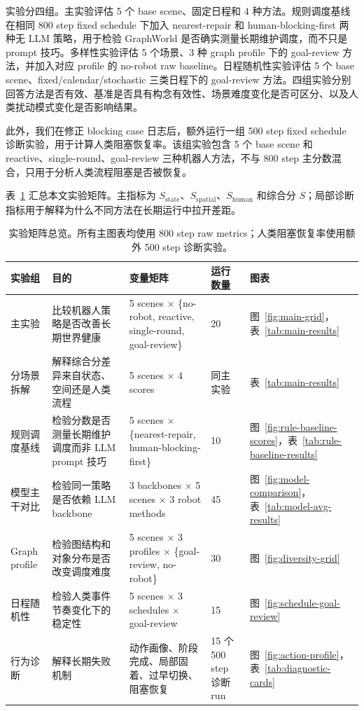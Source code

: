 \documentclass[journal]{IEEEtran}
\begin{document}
实验分四组。主实验评估 5 个 base scene、固定日程和 4 种方法。规则调度基线在相同 800 step fixed schedule 下加入 nearest-repair 和 human-blocking-first 两种无 LLM 策略，用于检验 GraphWorld 是否确实测量长期维护调度，而不只是 prompt 技巧。多样性实验评估 5 个场景、3 种 graph profile 下的 goal-review 方法，并加入对应 profile 的 no-robot raw baseline。日程随机性实验评估 5 个 base scene、fixed/calendar/stochastic 三类日程下的 goal-review 方法。四组实验分别回答方法是否有效、基准是否具有构念有效性、场景难度变化是否可区分、以及人类扰动模式变化是否影响结果。

此外，我们在修正 blocking case 日志后，额外运行一组 500 step fixed schedule 诊断实验，用于计算人类阻塞恢复率。该组实验包含 5 个 base scene 和 reactive、single-round、goal-review 三种机器人方法，不与 800 step 主分数混合，只用于分析人类流程阻塞是否被恢复。

表~\ref{tab:experiment-matrix} 汇总本文实验矩阵。主指标为 $S_{\mathrm{state}}$、$S_{\mathrm{spatial}}$、$S_{\mathrm{human}}$ 和综合分 $S$；局部诊断指标用于解释为什么不同方法在长期运行中拉开差距。

\begin{table}[t]
\centering
\caption{实验矩阵总览。所有主图表均使用 800 step raw metrics；人类阻塞恢复率使用额外 500 step 诊断实验。}
\label{tab:experiment-matrix}
\footnotesize
\setlength{\tabcolsep}{3.4pt}
\renewcommand{\arraystretch}{1.12}
\begin{tabular}{p{}p{}p{}p{}p{}}
\toprule
实验组 & 目的 & 变量矩阵 & 运行数量 & 图表 \\
\midrule
主实验 & 比较机器人策略是否改善长期世界健康 & 5 scenes $\times$ \{no-robot, reactive, single-round, goal-review\} & 20 & 图~\ref{fig:main-grid}，表~\ref{tab:main-results} \\
分场景拆解 & 解释综合分差异来自状态、空间还是人类流程 & 5 scenes $\times$ 4 scores & 同主实验 & 表~\ref{tab:main-results} \\
规则调度基线 & 检验分数是否测量长期维护调度而非 LLM prompt 技巧 & 5 scenes $\times$ \{nearest-repair, human-blocking-first\} & 10 & 图~\ref{fig:rule-baseline-scores}，表~\ref{tab:rule-baseline-results} \\
模型主干对比 & 检验同一策略是否依赖 LLM backbone & 3 backbones $\times$ 5 scenes $\times$ 3 robot methods & 45 & 图~\ref{fig:model-comparison}，表~\ref{tab:model-avg-results} \\
Graph profile & 检验图结构和对象分布是否改变调度难度 & 5 scenes $\times$ 3 profiles $\times$ \{goal-review, no-robot\} & 30 & 图~\ref{fig:diversity-grid} \\
日程随机性 & 检验人类事件节奏变化下的稳定性 & 5 scenes $\times$ 3 schedules $\times$ goal-review & 15 & 图~\ref{fig:schedule-goal-review} \\
行为诊断 & 解释长期失败机制 & 动作画像、阶段完成、局部固着、过早切换、阻塞恢复 & 15 个 500 step 诊断 run & 图~\ref{fig:action-profile}，表~\ref{tab:diagnostic-cards} \\
\bottomrule
\end{tabular}
\end{table}
\end{document}

